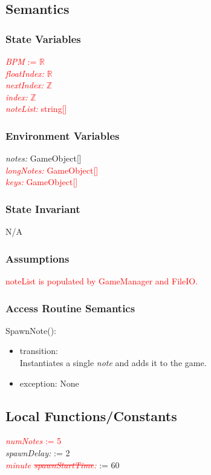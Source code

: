 \documentclass[12pt]{article}
\begin{document}
\subsection{Semantics}
\subsubsection{State Variables}
\textcolor{red}{\textit{BPM} := $\mathbb{R}$}\\
\textcolor{red}{\textit{floatIndex:} $\mathbb{R}$}\\
\textcolor{red}{\textit{nextIndex:} $\mathbb{Z}$}\\
\textcolor{red}{\textit{index:} $\mathbb{Z}$}\\
\textcolor{red}{\textit{noteList:} string[]}


\subsubsection{Environment Variables}
\textit{notes:} GameObject[]\\
\textcolor{red}{\textit{longNotes:} GameObject[]}\\
\textcolor{red}{\textit{keys:} GameObject[]}

\subsubsection{State Invariant}
N/A

\subsubsection{Assumptions}
\textcolor{red}{noteList is populated by GameManager and FileIO.}

\subsubsection{Access Routine Semantics}
\noindent SpawnNote():
\begin{itemize}
	\item transition:\\
	    Instantiates a single \textit{note} and adds it to the game.
	\item exception: None
\end{itemize}

\subsection{Local Functions/Constants}
\textcolor{red}{\textit{numNotes} := 5}\\
\textit{spawnDelay:} := 2\\
\textit{\textcolor{red}{minute \sout{spawnStartTime}:}} := 60
\end{document}

